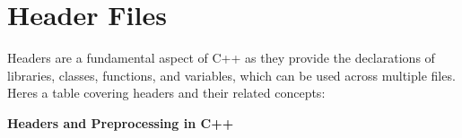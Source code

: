 \chapter{Header Files}
\hypertarget{md_docs_2own__docs_2cpp__fudamentals_2header__files}{}\label{md_docs_2own__docs_2cpp__fudamentals_2header__files}
\label{md_docs_2own__docs_2cpp__fudamentals_2header__files_autotoc_md95}%
%

\begin{DoxyItemize}
\item Headers are a fundamental aspect of C++ as they provide the declarations of libraries, classes, functions, and variables, which can be used across multiple files. Here\textquotesingle{}s a table covering headers and their related concepts\+:
\end{DoxyItemize}

{\bfseries{Headers and Preprocessing in C++}}

